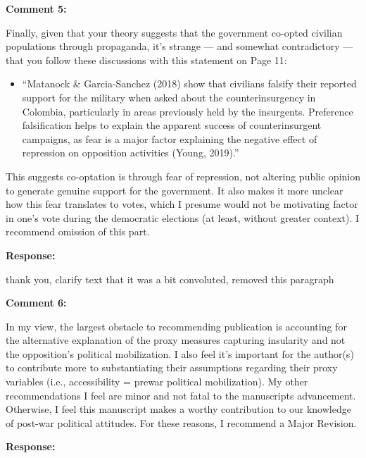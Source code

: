 \documentclass[12pt, a4paper, notitlepage]{article}
\begin{document}
\vspace{15pt}
\noindent\textbf{Comment 5:}
\begin{displayquote}
Finally, given that your theory suggests that the government co-opted civilian populations through propaganda, it’s strange — and somewhat contradictory — that you follow these discussions with this statement on Page 11:
\begin{itemize}
  \item[] ``Matanock \& Garcia-Sanchez (2018) show that civilians falsify their reported support for the military when asked about the counterinsurgency in Colombia, particularly in areas previously held by the insurgents. Preference falsification helps to explain the apparent success of counterinsurgent campaigns, as fear is a major factor explaining the negative effect of repression on opposition activities (Young, 2019).''
\end{itemize}
This suggests co-optation is through fear of repression, not altering public opinion to generate genuine support for the government. It also makes it more unclear how this fear translates to votes, which I presume would not be motivating factor in one’s vote during the democratic elections (at least, without greater context). I recommend omission of this part.
\end{displayquote}

\noindent\textbf{Response:} {}

thank you, clarify text that it was a bit convoluted, removed this paragraph

\vspace{15pt}
\noindent\textbf{Comment 6:}
\begin{displayquote}
In my view, the largest obstacle to recommending publication is accounting for the alternative explanation of the proxy measures capturing insularity and not the opposition’s political mobilization. I also feel it’s important for the author(s) to contribute more to substantiating their assumptions regarding their proxy variables (i.e., accessibility = prewar political mobilization). My other recommendations I feel are minor and not fatal to the manuscripts advancement. Otherwise, I feel this manuscript makes a worthy contribution to our knowledge of post-war political attitudes. For these reasons, I recommend a Major Revision.
\end{displayquote}

\noindent\textbf{Response:} {}
\end{document}
